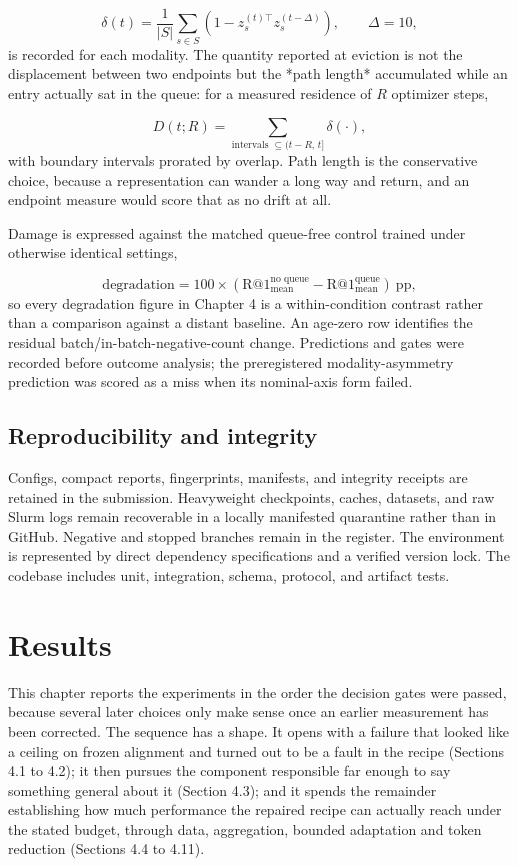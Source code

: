 \begin{equation*}
\delta(t) = \frac{1}{|S|} \sum_{s \in S}
\left( 1 - z_s^{(t)\top} z_s^{(t - \Delta)} \right),
\qquad \Delta = 10,
\end{equation*}
is recorded for each modality. The quantity reported at eviction is not the displacement between two endpoints but the *path length* accumulated while an entry actually sat in the queue: for a measured residence of $R$ optimizer steps,

\begin{equation*}
D(t; R) = \sum_{\text{intervals } \subseteq (t - R,\, t]} \delta(\cdot),
\end{equation*}
with boundary intervals prorated by overlap. Path length is the conservative choice, because a representation can wander a long way and return, and an endpoint measure would score that as no drift at all.

Damage is expressed against the matched queue-free control trained under otherwise identical settings,

\begin{equation*}
\mathrm{degradation} = 100 \times
\left( \mathrm{R@1}^{\text{no queue}}_{\text{mean}}
     - \mathrm{R@1}^{\text{queue}}_{\text{mean}} \right)
\ \text{pp},
\end{equation*}
so every degradation figure in Chapter 4 is a within-condition contrast rather than a comparison against a distant baseline. An age-zero row identifies the residual batch/in-batch-negative-count change. Predictions and gates were recorded before outcome analysis; the preregistered modality-asymmetry prediction was scored as a miss when its nominal-axis form failed.

\section{Reproducibility and integrity}
Configs, compact reports, fingerprints, manifests, and integrity receipts are retained in the submission. Heavyweight checkpoints, caches, datasets, and raw Slurm logs remain recoverable in a locally manifested quarantine rather than in GitHub. Negative and stopped branches remain in the register. The environment is represented by direct dependency specifications and a verified version lock. The codebase includes unit, integration, schema, protocol, and artifact tests.

\chapter{Results}
This chapter reports the experiments in the order the decision gates were passed, because several later choices only make sense once an earlier measurement has been corrected. The sequence has a shape. It opens with a failure that looked like a ceiling on frozen alignment and turned out to be a fault in the recipe (Sections 4.1 to 4.2); it then pursues the component responsible far enough to say something general about it (Section 4.3); and it spends the remainder establishing how much performance the repaired recipe can actually reach under the stated budget, through data, aggregation, bounded adaptation and token reduction (Sections 4.4 to 4.11).

